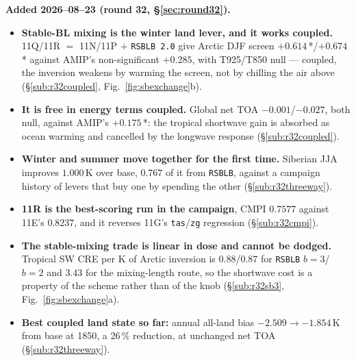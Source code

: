 \documentclass[10pt]{article}
\begin{document}
\textbf{Added 2026--08--23 (round 32, \S\ref{sec:round32}).}
\begin{itemize}\itemsep2pt
\item \textbf{Stable-BL mixing is the winter land lever, and it works coupled.} 11Q/11R
$=$ 11N/11P $+$ \texttt{RSBLB 2.0} give Arctic DJF screen $+0.614$\,*/$+0.674$\,* against
AMIP's non-significant $+0.285$, with T925/T850 null --- coupled, the inversion weakens by
warming the screen, not by chilling the air above (\S\ref{sub:r32coupled},
Fig.~\ref{fig:sbexchange}b).
\item \textbf{It is free in energy terms coupled.} Global net TOA $-0.001$/$-0.027$,
both null, against AMIP's $+0.175$\,*: the tropical shortwave gain is absorbed as ocean
warming and cancelled by the longwave response (\S\ref{sub:r32coupled}).
\item \textbf{Winter and summer move together for the first time.} Siberian JJA improves
$1.000$\,K over base, $0.767$ of it from \texttt{RSBLB}, against a campaign history of
levers that buy one by spending the other (\S\ref{sub:r32threeway}).
\item \textbf{11R is the best-scoring run in the campaign}, CMPI $0.7577$ against 11E's
$0.8237$, and it reverses 11G's \texttt{tas}/\texttt{zg} regression
(\S\ref{sub:r32cmpi}).
\item \textbf{The stable-mixing trade is linear in dose and cannot be dodged.} Tropical
SW CRE per K of Arctic inversion is $0.88$/$0.87$ for \texttt{RSBLB} $b{=}3$/$b{=}2$ and
$3.43$ for the mixing-length route, so the shortwave cost is a property of the scheme
rather than of the knob (\S\ref{sub:r32sb3}, Fig.~\ref{fig:sbexchange}a).
\item \textbf{Best coupled land state so far:} annual all-land bias $-2.509\to-1.854$\,K
from base at 1850, a 26\,\% reduction, at unchanged net TOA (\S\ref{sub:r32threeway}).
\end{itemize}
\end{document}
